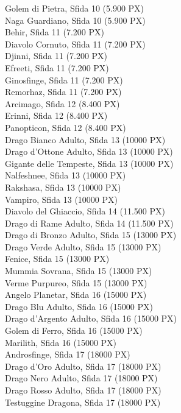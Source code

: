 \begin{multicols}{3}
{Golem di Pietra, Sfida 10 (5.900 PX)\\
Naga Guardiano, Sfida 10 (5.900 PX)\\
Behir, Sfida 11 (7.200 PX)\\
Diavolo Cornuto, Sfida 11 (7.200 PX)\\
Djinni, Sfida 11 (7.200 PX)\\
Efreeti, Sfida 11 (7.200 PX)\\
Ginosfinge, Sfida 11 (7.200 PX)\\
Remorhaz, Sfida 11 (7.200 PX)\\
Arcimago, Sfida 12 (8.400 PX)\\
Erinni, Sfida 12 (8.400 PX)\\
Panopticon, Sfida 12 (8.400 PX)\\
Drago Bianco Adulto, Sfida 13 (10000 PX)\\
Drago d'Ottone Adulto, Sfida 13 (10000 PX)\\
Gigante delle Tempeste, Sfida 13 (10000 PX)\\
Nalfeshnee, Sfida 13 (10000 PX)\\
Rakshasa, Sfida 13 (10000 PX)\\
Vampiro, Sfida 13 (10000 PX)\\
Diavolo del Ghiaccio, Sfida 14 (11.500 PX)\\
Drago di Rame Adulto, Sfida 14 (11.500 PX)\\
Drago di Bronzo Adulto, Sfida 15 (13000 PX)\\
Drago Verde Adulto, Sfida 15 (13000 PX)\\
Fenice, Sfida 15 (13000 PX)\\
Mummia Sovrana, Sfida 15 (13000 PX)\\
Verme Purpureo, Sfida 15 (13000 PX)\\
Angelo Planetar, Sfida 16 (15000 PX)\\
Drago Blu Adulto, Sfida 16 (15000 PX)\\
Drago d'Argento Adulto, Sfida 16 (15000 PX)\\
Golem di Ferro, Sfida 16 (15000 PX)\\
Marilith, Sfida 16 (15000 PX)\\
Androsfinge, Sfida 17 (18000 PX)\\
Drago d'Oro Adulto, Sfida 17 (18000 PX)\\
Drago Nero Adulto, Sfida 17 (18000 PX)\\
Drago Rosso Adulto, Sfida 17 (18000 PX)\\
Testuggine Dragona, Sfida 17 (18000 PX)\\
}
\end{multicols}
